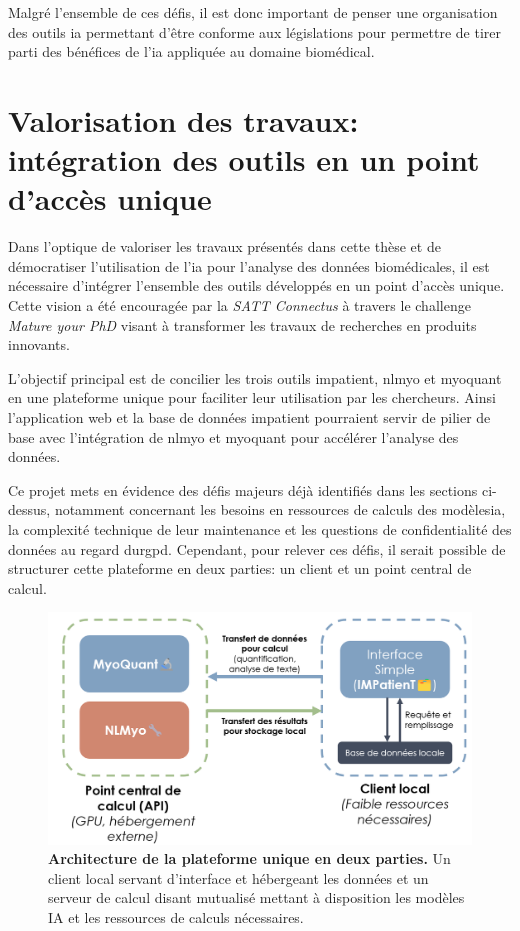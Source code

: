 Malgré l'ensemble de ces défis, il est donc important de penser une organisation des outils \gls{ia} permettant d'être conforme aux législations pour permettre de tirer parti des bénéfices de l'\gls{ia} appliquée au domaine biomédical.

\section{Valorisation des travaux: intégration des outils en un point d'accès unique}
Dans l'optique de valoriser les travaux présentés dans cette thèse et de démocratiser l'utilisation de l’\gls{ia} pour l'analyse des données biomédicales, il est nécessaire d'intégrer l'ensemble des outils développés en un point d'accès unique. Cette vision a été encouragée par la \textit{SATT Connectus} à travers le challenge \textit{Mature your PhD} visant à transformer les travaux de recherches en produits innovants.

L'objectif principal est de concilier les trois outils \gls{impatient}, \gls{nlmyo} et \gls{myoquant} en une plateforme unique pour faciliter leur utilisation par les chercheurs. Ainsi l'application web et la base de données \gls{impatient} pourraient servir de pilier de base avec l'intégration de \gls{nlmyo} et \gls{myoquant} pour accélérer l'analyse des données.

Ce projet mets en évidence des défis majeurs déjà identifiés dans les sections ci-dessus, notamment concernant les besoins en ressources de calculs des modèles\gls{ia}, la complexité technique de leur maintenance et les questions de confidentialité des données au regard du\gls{rgpd}. Cependant, pour relever ces défis, il serait possible de structurer cette plateforme en deux parties: un client et un point central de calcul.
 \begin{figure}[!ht]
 \centering
 \includegraphics[width=1\textwidth]{figures/perspective_unique.png}
 \caption[Architecture de la plateforme unique en deux parties]{\textbf{Architecture de la plateforme unique en deux parties.} Un client local servant d'interface et hébergeant les données et un serveur de calcul disant mutualisé mettant à disposition les modèles IA et les ressources de calculs nécessaires.}
 \label{fig:perspective_unique}
\end{figure}

